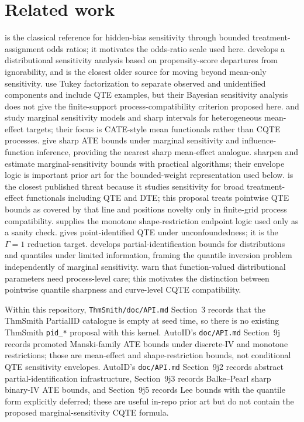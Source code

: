 \documentclass[11pt]{article}
\theoremstyle{definition}
\theoremstyle{plain}
\theoremstyle{remark}
\begin{document}
\section{Related work}
\citet{Rosenbaum1995} is the classical reference for hidden-bias sensitivity through bounded treatment-assignment odds ratios; it motivates the odds-ratio scale used here.  \citet{Tan2006} develops a distributional sensitivity analysis based on propensity-score departures from ignorability, and is the closest older source for moving beyond mean-only sensitivity.  \citet{DAmourFranksFeller2019} use Tukey factorization to separate observed and unidentified components and include QTE examples, but their Bayesian sensitivity analysis does not give the finite-support process-compatibility criterion proposed here.  \citet{ZhaoSmallBhattacharya2019} and \citet{KallusMaoZhou2019} study marginal sensitivity models and sharp intervals for heterogeneous mean-effect targets; their focus is CATE-style mean functionals rather than CQTE processes.  \citet{YadlowskyNamkoongBasuDuchiTian2022} give sharp ATE bounds under marginal sensitivity and influence-function inference, providing the nearest sharp mean-effect analogue.  \citet{DornGuo2023} sharpen and estimate marginal-sensitivity bounds with practical algorithms; their envelope logic is important prior art for the bounded-weight representation used below.  \citet{MastenPoirierRen2025} is the closest published threat because it studies sensitivity for broad treatment-effect functionals including QTE and DTE; this proposal treats pointwise QTE bounds as covered by that line and positions novelty only in finite-grid process compatibility.  \citet{ManskiPepper2000} supplies the monotone shape-restriction endpoint logic used only as a sanity check.  \citet{Firpo2007} gives point-identified QTE under unconfoundedness; it is the \(\Gamma=1\) reduction target.  \citet{FanPark2010} develops partial-identification bounds for distributions and quantiles under limited information, framing the quantile inversion problem independently of marginal sensitivity.  \citet{FirpoRidder2019} warn that function-valued distributional parameters need process-level care; this motivates the distinction between pointwise quantile sharpness and curve-level CQTE compatibility.

Within this repository, \texttt{ThmSmith/doc/API.md} Section~3 records that the ThmSmith PartialID catalogue is empty at seed time, so there is no existing ThmSmith \texttt{pid\_*} proposal with this kernel.  AutoID's \texttt{doc/API.md} Section~9j records promoted Manski-family ATE bounds under discrete-IV and monotone restrictions; those are mean-effect and shape-restriction bounds, not conditional QTE sensitivity envelopes.  AutoID's \texttt{doc/API.md} Section~9j2 records abstract partial-identification infrastructure, Section~9j3 records Balke--Pearl sharp binary-IV ATE bounds, and Section~9j5 records Lee bounds with the quantile form explicitly deferred; these are useful in-repo prior art but do not contain the proposed marginal-sensitivity CQTE formula.
\end{document}
